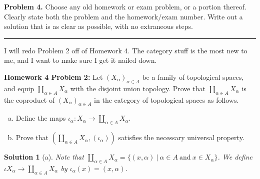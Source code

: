 \documentclass[leqno]{article}
\theoremstyle{nonumberplain}
\newtheorem{solution}{Solution}
\begin{document}
\pagebreak





\noindent\textbf{Problem 4.} Choose any old homework or exam problem, or a portion thereof. Clearly state both the problem and the homework/exam number. Write out a solution that is as clear as possible, with no extraneous steps.

\noindent\rule[0.5ex]{\linewidth}{1pt}

\noindent I will redo Problem 2 off of Homework 4.  The category stuff is the most new to me, and I want to make sure I get it nailed down.

\noindent\textbf{Homework 4 Problem 2:} Let $(X_\alpha)_{\alpha \in A}$ be a family of topological spaces, and equip $\coprod_{\alpha \in A} X_\alpha$ with the disjoint union topology. Prove that $\coprod_{\alpha \in A} X_\alpha$ is the coproduct of $(X_\alpha)_{\alpha \in A}$ in the category of topological spaces as follows.
\begin{enumerate}[(a)]
\item Define the maps $\iota_\alpha \colon X_\alpha \to \coprod_{\alpha \in A} X_\alpha$.
\item Prove that $(\coprod_{\alpha \in A} X_\alpha, (\iota_\alpha))$ satisfies the necessary universal property.
\end{enumerate}

\begin{solution}[a]
Note that $\coprod_{\alpha \in A} X_\alpha = \{(x,\alpha)~\vert ~ \alpha \in A~ \textrm{and}~ x\in X_\alpha\}$.  We define $\iota X_\alpha \to \coprod_{\alpha \in A} X_\alpha$ by $\iota_\alpha (x)= (x,\alpha)$. 
\end{solution}
\end{document}
